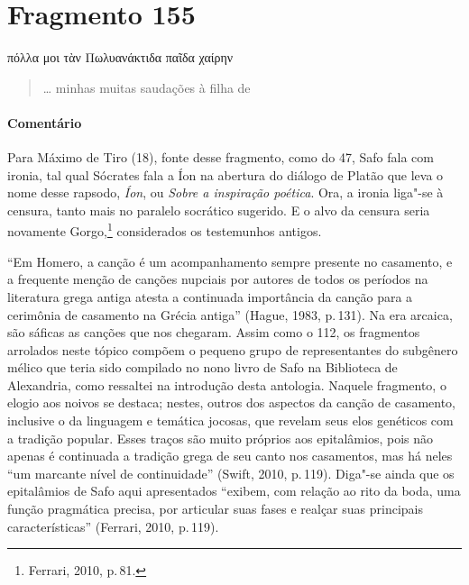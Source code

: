 \section{Fragmento 155}

\begin{gkverse}
πόλλα μοι τὰν Πωλυανάκτιδα παῖδα χαίρην
\end{gkverse}

\begin{verse}
\ldots{} minhas muitas saudações à filha de 
\end{verse}

\medskip

{\paragraph{Comentário} Para Máximo de Tiro (18), fonte desse fragmento, como do 47, Safo fala com ironia, tal qual
Sócrates fala a Íon na abertura do diálogo de Platão que leva o nome desse
rapsodo, \emph{Íon}, ou \emph{Sobre a inspiração poética}. Ora, a ironia
liga"-se à censura, tanto mais no paralelo socrático sugerido.
E o alvo da censura seria novamente Gorgo,\footnote{Ferrari, 2010, p.\,81.} considerados os testemunhos antigos.}

\begin{argumento}
``Em Homero, a canção é um acompanhamento sempre presente no casamento, e a frequente menção de canções nupciais por autores de todos os períodos na literatura grega antiga atesta a continuada importância da canção para a cerimônia de casamento na Grécia antiga'' (Hague, 1983, p.\,131). Na era arcaica, são sáficas as canções que nos chegaram. Assim como o 112, os fragmentos arrolados neste tópico compõem o pequeno grupo
de representantes do subgênero mélico que teria sido compilado no nono livro de
Safo na Biblioteca de Alexandria, como ressaltei na introdução desta antologia.
Naquele fragmento, o elogio aos noivos se destaca; nestes, outros dos aspectos
da canção de casamento, inclusive o da linguagem e temática jocosas, que
revelam seus elos genéticos com a tradição popular.
Esses traços são muito próprios aos epitalâmios, pois não apenas é continuada a tradição grega de seu canto nos casamentos, mas há neles  ``um marcante nível de continuidade'' (Swift, 2010, p.\,119). Diga"-se ainda que os epitalâmios de Safo aqui apresentados ``exibem, com relação ao rito da boda, uma função pragmática precisa, por articular suas fases e realçar suas principais características'' (Ferrari, 2010, 
p.\,119). 
\end{argumento}

